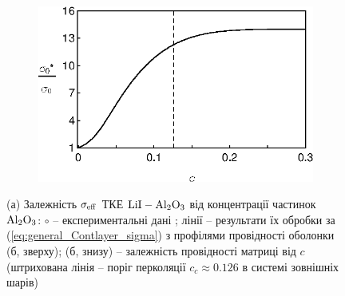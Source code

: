 \documentclass[twoside,a4paper,14pt]{vakaref-utf8}
\begin{document}
\begin{figure}[tb]
\begin{subfigure}[c]{0.35\textwidth}
		\includegraphics[width=\textwidth]{Liang-matrix-a06.eps}
		\caption{} \label{fig:Liang_LiI-Al2O3-Processing-b}
	\end{subfigure}%
	\caption{\label{fig:Liang_LiI-Al2O3-Processing} (а) Залежність $\sigma_{\rm eff}$ ТКЕ $\rm{LiI-Al_2O_3}$ від концентрації частинок $\rm Al_2O_3$: $\circ$ -- експериментальні дані \cite{Liang1973}; лінії -- результати їх обробки за (\ref{eq:general_Contlayer_sigma}) з профілями провідності оболонки (б, зверху); (б, знизу) -- залежність провідності матриці
		від $c$ (штрихована лінія -- поріг перколяції $c_{c} \approx 0.126$ в системі зовнішніх шарів)}
\vspace{-10pt}
\end{figure}
\end{document}
